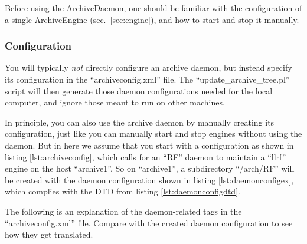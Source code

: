 Before using the ArchiveDaemon, one should be familiar
with the configuration of a single ArchiveEngine (sec.\ \ref{sec:engine}),
and how to start and stop it manually.

\subsubsection{Configuration}
You will typically \emph{not} directly configure an archive daemon,
but instead specify its configuration in the ``archiveconfig.xml''
file. The ``update\_archive\_tree.pl'' script will then generate
those daemon configurations needed for the local computer, and ignore
those meant to run on other machines.

In principle, you can also use the archive daemon by manually creating
its configuration, just like you can manually start and stop engines
without using the daemon. But in here we assume that you start with a
configuration as shown in listing \ref{lst:archiveconfig},
which calls for an ``RF'' daemon to maintain a ``llrf'' engine on the host
``archive1''. So on ``archive1'', a subdirectory ``/arch/RF'' will be
created with the daemon configuration shown in listing 
\ref{lst:daemonconfigex}, which complies with the DTD from listing
\ref{lst:daemonconfigdtd}.



\noindent The following is an explanation of the daemon-related tags in the
``archiveconfig.xml'' file. Compare with the created daemon
configuration to see how they get translated.

